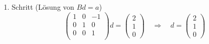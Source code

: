 \documentclass[a4paper]{scrartcl}
\begin{document}
\begin{enumerate}[label=\bfseries\arabic*.]
\begin{enumerate}
\begin{enumerate}[1.]
\begin{enumerate}[1.]
                            \item Schritt (Lösung von $Bd = a$)
                                \begin{equation}
                                    \begin{pmatrix}
                                        1 & 0 & -1 \\
                                        0 & 1 & 0 \\
                                        0 & 0 & 1 \\
                                    \end{pmatrix}
                                    d
                                    =
                                    \begin{pmatrix}
                                        2 \\ 1 \\ 0
                                    \end{pmatrix}
                                    \quad\Rightarrow\quad
                                    d =
                                    \begin{pmatrix}
                                        2 \\ 1 \\ 0
                                    \end{pmatrix}
                                \end{equation}


\end{enumerate}
\end{enumerate}
\end{enumerate}
\end{enumerate}
\end{document}
